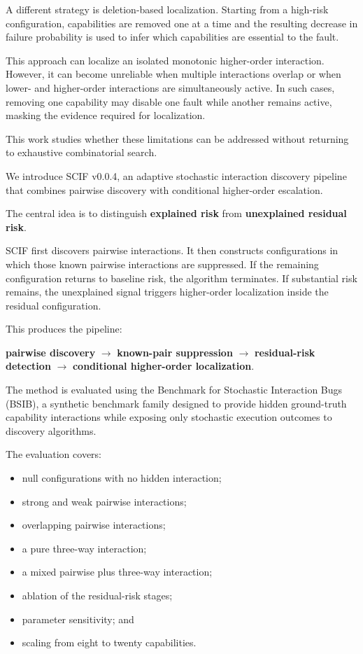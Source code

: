 A different strategy is deletion-based localization. Starting from a high-risk configuration, capabilities are removed one at a time and the resulting decrease in failure probability is used to infer which capabilities are essential to the fault.

This approach can localize an isolated monotonic higher-order interaction. However, it can become unreliable when multiple interactions overlap or when lower- and higher-order interactions are simultaneously active. In such cases, removing one capability may disable one fault while another remains active, masking the evidence required for localization.

This work studies whether these limitations can be addressed without returning to exhaustive combinatorial search.

We introduce SCIF v0.0.4, an adaptive stochastic interaction discovery pipeline that combines pairwise discovery with conditional higher-order escalation.

The central idea is to distinguish \textbf{explained risk} from \textbf{unexplained residual risk}.

SCIF first discovers pairwise interactions. It then constructs configurations in which those known pairwise interactions are suppressed. If the remaining configuration returns to baseline risk, the algorithm terminates. If substantial risk remains, the unexplained signal triggers higher-order localization inside the residual configuration.

This produces the pipeline:

\textbf{pairwise discovery} \(\rightarrow\) \textbf{known-pair suppression} \(\rightarrow\) \textbf{residual-risk detection} \(\rightarrow\) \textbf{conditional higher-order localization}.

The method is evaluated using the Benchmark for Stochastic Interaction Bugs (BSIB), a synthetic benchmark family designed to provide hidden ground-truth capability interactions while exposing only stochastic execution outcomes to discovery algorithms.

The evaluation covers:

\begin{itemize}
\tightlist
\item
  null configurations with no hidden interaction;
\item
  strong and weak pairwise interactions;
\item
  overlapping pairwise interactions;
\item
  a pure three-way interaction;
\item
  a mixed pairwise plus three-way interaction;
\item
  ablation of the residual-risk stages;
\item
  parameter sensitivity; and
\item
  scaling from eight to twenty capabilities.
\end{itemize}

